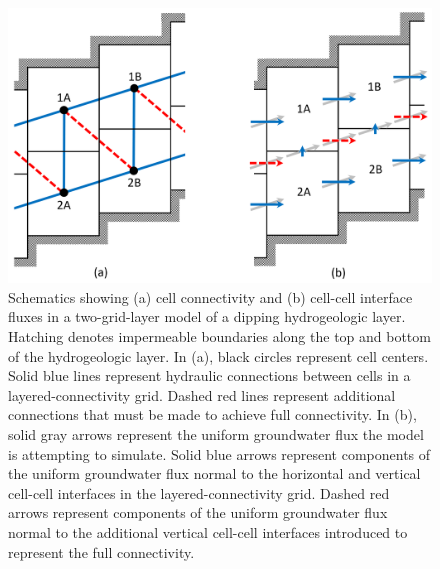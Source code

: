\documentclass{article}
\begin{document}
\begin{figure}
	\begin{center}
	\includegraphics[scale=1.0]{../figures/fig1_paper.png}
	\caption{Schematics showing (a) cell connectivity and (b) cell-cell interface fluxes in a two-grid-layer model of a dipping hydrogeologic layer. Hatching denotes impermeable boundaries along the top and bottom of the hydrogeologic layer. In (a), black circles represent cell centers. Solid blue lines represent hydraulic connections between cells in a layered-connectivity grid. Dashed red lines represent additional connections that must be made to achieve full connectivity. In (b), solid gray arrows represent the uniform groundwater flux the model is attempting to simulate. Solid blue arrows represent components of the uniform groundwater flux normal to the horizontal and vertical cell-cell interfaces in the layered-connectivity grid. Dashed red arrows represent components of the uniform groundwater flux normal to the additional vertical cell-cell interfaces introduced to represent the full connectivity.}
	\label{fig:schem-conn-area-flux}
	\end{center}
\end{figure}
\end{document}
